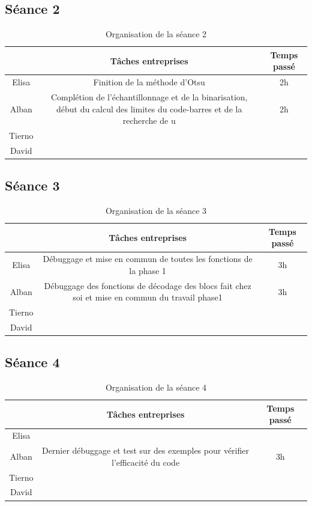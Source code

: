 \documentclass{rapport}
\begin{document}
\subsection{Séance 2}

\begin{table}[H]
	\centering 
	\begin{tabular}{c|c|c}
		& Tâches entreprises& Temps passé\\ \hline
		Elisa& Finition de la méthode d'Otsu & 2h\\ \hline
		Alban& Complétion de l'échantillonnage et de la binarisation, début du calcul des limites du code-barres et de la recherche de u& 2h\\ \hline
		Tierno& & \\ \hline
		David& & 
	\end{tabular}
	\caption{Organisation de la séance 2}
\end{table}

\subsection{Séance 3}

\begin{table}[H]
	\centering 
	\begin{tabular}{c|c|c}
		& Tâches entreprises& Temps passé\\ \hline
		Elisa& Débuggage et mise en commun de toutes les fonctions de la phase 1 & 3h\\ \hline
		Alban& Débuggage des fonctions de décodage des blocs fait chez soi et mise en commun du travail phase1& 3h\\ \hline
		Tierno& & \\ \hline
		David& & 
	\end{tabular}
	\caption{Organisation de la séance 3}
\end{table}

\subsection{Séance 4}

\begin{table}[H]
	\centering 
	\begin{tabular}{c|c|c}
		& Tâches entreprises& Temps passé\\ \hline
		Elisa& & \\ \hline
		Alban& Dernier débuggage et test sur des exemples pour vérifier l'efficacité du code& 3h\\ \hline
		Tierno& & \\ \hline
		David& & 
	\end{tabular}
	\caption{Organisation de la séance 4}
\end{table}
\end{document}
